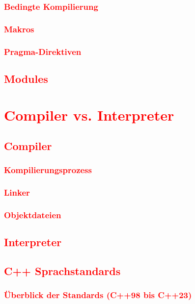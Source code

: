 \subsection{\textcolor{red}{Bedingte Kompilierung}}\label{sec:conditional-compilation}
\subsection{\textcolor{red}{Makros}}\label{sec:macros}
\subsection{\textcolor{red}{Pragma-Direktiven}}\label{sec:pragma}
\section{\textcolor{red}{Modules}}\label{sec:modules}

\chapter{\textcolor{red}{Compiler vs. Interpreter}}\label{chap:compiler-vs-interpreter}
\section{\textcolor{red}{Compiler}}\label{sec:compiler}
\subsection{\textcolor{red}{Kompilierungsprozess}}\label{sec:compilation-process}
\subsection{\textcolor{red}{Linker}}\label{sec:linker}
\subsection{\textcolor{red}{Objektdateien}}\label{sec:object-files}
\section{\textcolor{red}{Interpreter}}\label{sec:interpreter}
\section{\textcolor{red}{C++ Sprachstandards}}\label{sec:cpp-standards}
\subsection{\textcolor{red}{Überblick der Standards (C++98 bis C++23)}}\label{sec:standards-overview}

